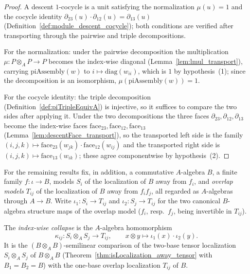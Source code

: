 \begin{proof}
  \leanok
  A descent \(1\)-cocycle is a unit satisfying the normalization \(\mu(u) = 1\) and the
  cocycle identity \(\partial_{23}(u) \cdot \partial_{12}(u) = \partial_{13}(u)\)
  (Definition~\ref{def:module_descent_cocycle}); both conditions are verified after
  transporting through the pairwise and triple decompositions.

  For the normalization: under the pairwise decomposition the multiplication
  \(\mu \colon P \otimes_A P \to P\) becomes the index-wise diagonal
  (Lemma~\ref{lem:lmul_transport}), carrying \(\mathrm{piAssembly}(w)\) to
  \(i \mapsto \mathrm{diag}(w_{ii})\), which is \(1\) by hypothesis~(1); since the
  decomposition is an isomorphism, \(\mu(\mathrm{piAssembly}(w)) = 1\).

  For the cocycle identity: the triple decomposition (Definition~\ref{def:piTripleEquivA})
  is injective, so it suffices to compare the two sides after applying it. Under the two
  decompositions the three faces \(\partial_{23}, \partial_{12}, \partial_{13}\) become the
  index-wise faces \(\mathrm{face}_{23}, \mathrm{face}_{12}, \mathrm{face}_{13}\)
  (Lemma~\ref{lem:descentFace_transport}), so the transported left side is the family
  \((i,j,k) \mapsto \mathrm{face}_{23}(w_{jk}) \cdot \mathrm{face}_{12}(w_{ij})\) and the
  transported right side is \((i,j,k) \mapsto \mathrm{face}_{13}(w_{ik})\); these agree
  componentwise by hypothesis~(2).
\end{proof}

For the remaining results fix, in addition, a commutative \(A\)-algebra \(B\), a finite
family \(f \colon \iota \to B\), models \(S_i\) of the localization of \(B\) away from
\(f_i\), and \emph{overlap models} \(T_{ij}\) of the localization of \(B\) away from
\(f_i f_j\), all regarded as \(A\)-algebras through \(A \to B\). Write
\(\iota_1 \colon S_i \to T_{ij}\) and \(\iota_2 \colon S_j \to T_{ij}\) for the two canonical
\(B\)-algebra structure maps of the overlap model (\(f_i\), resp.\ \(f_j\), being invertible
in \(T_{ij}\)).

\begin{definition}
  \label{def:componentCollapse}
  \leanok
  The \emph{index-wise collapse} is the \(A\)-algebra homomorphism
  \[
    \kappa_{ij} \colon S_i \otimes_A S_j \longrightarrow T_{ij}, \qquad
    x \otimes y \mapsto \iota_1(x) \cdot \iota_2(y) .
  \]
  It is the \((B \otimes_A B)\)-semilinear comparison of the two-base tensor localization
  \(S_i \otimes_A S_j\) of \(B \otimes_A B\) (Theorem~\ref{thm:isLocalization_away_tensor}
  with \(B_1 = B_2 = B\)) with the one-base overlap localization \(T_{ij}\) of \(B\).
\end{definition}

